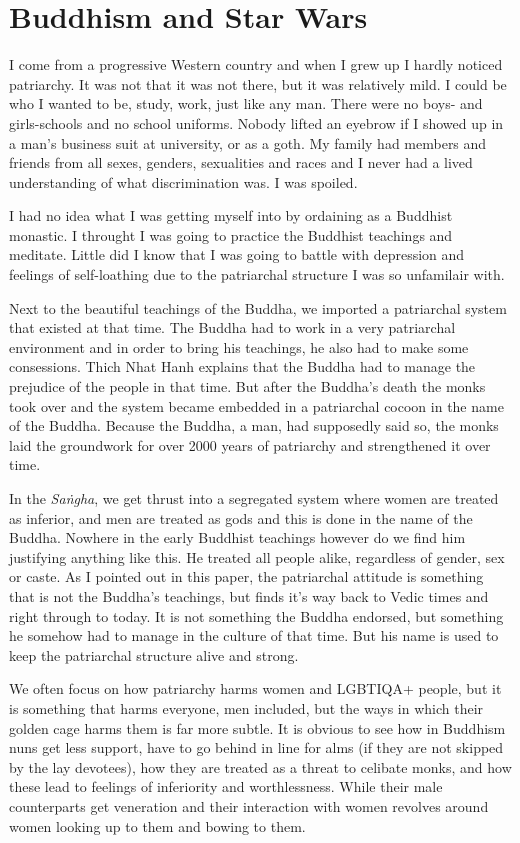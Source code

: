 \section{Buddhism and Star Wars}

I come from a progressive Western country and when I grew up I hardly noticed patriarchy. It was not that it was not there, but it was relatively mild. I could be who I wanted to be, study, work, just like any man. There were no boys- and girls-schools and no school uniforms. Nobody lifted an eyebrow if I showed up in a man's business suit at university, or as a goth. My family had members and friends from all sexes, genders, sexualities and races and I never had a lived understanding of what discrimination was. I was spoiled. 

I had no idea what I was getting myself into by ordaining as a Buddhist monastic. I throught I was going to practice the Buddhist teachings and meditate. Little did I know that I was going to battle with depression and feelings of self-loathing due to the patriarchal structure I was so unfamilair with.

Next to the beautiful teachings of the Buddha, we imported a patriarchal system that existed at that time. The Buddha had to work in a very patriarchal environment and in order to bring his teachings, he also had to make some consessions. Thich Nhat Hanh explains that the Buddha had to manage the prejudice of the people in that time. But after the Buddha's death the monks took over and the system became embedded in a patriarchal cocoon in the name of the Buddha. Because the Buddha, a man, had supposedly said so, the monks laid the groundwork for over 2000 years of patriarchy and strengthened it over time.

In the {\em Saṅgha}, we get thrust into a segregated system where women are treated as inferior, and men are treated as gods and this is done in the name of the Buddha. Nowhere in the early Buddhist teachings however do we find him justifying anything like this. He treated all people alike, regardless of gender, sex or caste. As I pointed out in this paper, the patriarchal attitude is something that is not the Buddha's teachings, but finds it's way back to Vedic times and right through to today. It is not something the Buddha endorsed, but something he somehow had to manage in the culture of that time. But his name is used to keep the patriarchal structure alive and strong.

We often focus on how patriarchy harms women and LGBTIQA+ people, but it is something that harms everyone, men included, but the ways in which their golden cage harms them is far more subtle. It is obvious to see how in Buddhism nuns get less support, have to go behind in line for alms (if they are not skipped by the lay devotees), how they are treated as a threat to celibate monks, and how these lead to feelings of inferiority and worthlessness. While their male counterparts get veneration and their interaction with women revolves around women looking up to them and bowing to them. 

